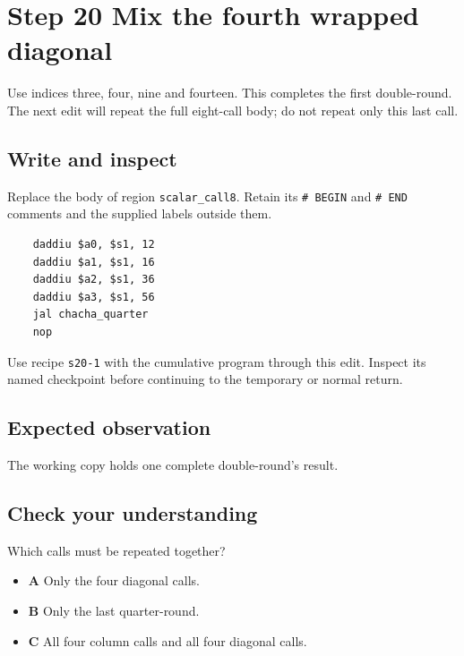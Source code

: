 \section{Step 20 Mix the fourth wrapped diagonal}\label{chacha-s20}

Use indices three, four, nine and fourteen. This completes the first double-round. The next edit will repeat the full eight-call body; do not repeat only this last call.

\subsection{Write and inspect}
Replace the body of region \texttt{scalar\_call8}. Retain its \texttt{\# BEGIN} and \texttt{\# END} comments and the supplied labels outside them.

\begin{verbatim}
    daddiu $a0, $s1, 12
    daddiu $a1, $s1, 16
    daddiu $a2, $s1, 36
    daddiu $a3, $s1, 56
    jal chacha_quarter
    nop
\end{verbatim}

Use recipe \texttt{s20-1} with the cumulative program through this edit. Inspect its named checkpoint before continuing to the temporary or normal return.

\subsection{Expected observation}
The working copy holds one complete double-round's result.

\subsection{Check your understanding}
Which calls must be repeated together?

\begin{itemize}
  \item \textbf{A} Only the four diagonal calls.
  \item \textbf{B} Only the last quarter-round.
  \item \textbf{C} All four column calls and all four diagonal calls.
\end{itemize}
